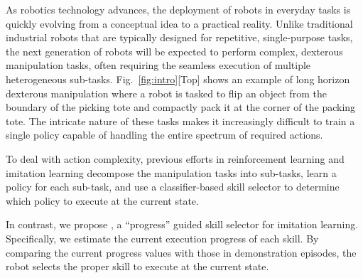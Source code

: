 As robotics technology advances, the deployment of robots in everyday tasks is quickly evolving from a conceptual idea to a practical reality.
Unlike traditional industrial robots that are typically designed for repetitive, single-purpose tasks, the next generation of robots will be expected to perform complex, dexterous manipulation tasks, often requiring the seamless execution of multiple heterogeneous sub-tasks. 
Fig.~\ref{fig:intro}[Top] shows an example of long horizon dexterous manipulation where a robot is tasked to flip an object from the boundary of the picking tote and compactly pack it at the corner of the packing tote.
The intricate nature of these tasks makes it increasingly difficult to train a single policy capable of handling the entire spectrum of required actions.


To deal with action complexity, previous efforts in reinforcement learning\cite{nasiriany2022augmenting} and imitation learning\cite{belkhale2023hydra} decompose the manipulation tasks into sub-tasks, learn a policy for each sub-task, and use a classifier-based skill selector to determine which policy to execute at the current state.
 
In contrast, we propose \progss, a ``progress'' guided skill selector for imitation learning. 
Specifically, we estimate the current execution progress of each skill. 
By comparing the current progress values with those in demonstration episodes, the robot selects the proper skill to execute at the current state.

